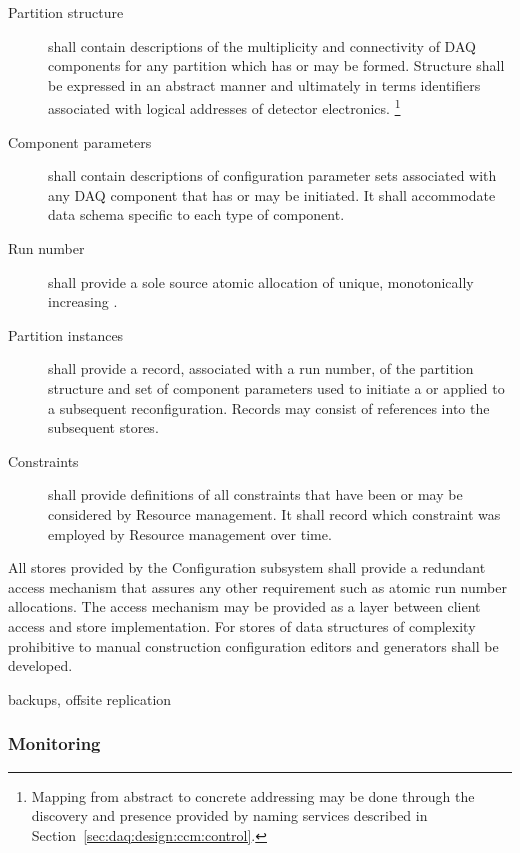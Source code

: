 \begin{description}

\item[Partition structure] shall contain descriptions of the multiplicity and connectivity of DAQ components for any partition which has or may be formed. 
  Structure shall be expressed in an abstract manner and ultimately in terms identifiers associated with logical addresses of detector electronics. \footnote{Mapping from abstract to concrete addressing may be done through the discovery and presence provided by naming services described in Section~\ref{sec:daq:design:ccm:control}.}

\item[Component parameters] shall contain descriptions of configuration parameter sets associated with any DAQ component that has or may be initiated.  It shall accommodate data schema specific to each type of component. 

\item[Run number] shall provide a sole source atomic allocation of unique, monotonically increasing .

\item[Partition instances] shall provide a record, associated with a run number, of the partition structure and set of component parameters used to initiate a  or applied to a subsequent reconfiguration.  Records may consist of references into the subsequent stores.

\item[Constraints] shall provide definitions of all constraints that have been or may be considered by Resource management. 
  It shall record which constraint was employed by Resource management over time.
\end{description}


All stores provided by the Configuration subsystem shall provide a redundant access mechanism that assures any other requirement such as atomic run number allocations. 
The access mechanism may be provided as a layer between client access and store implementation.
For stores of data structures of complexity prohibitive to manual construction configuration editors and generators shall be developed.

backups, offsite replication


\subsubsection{Monitoring}

